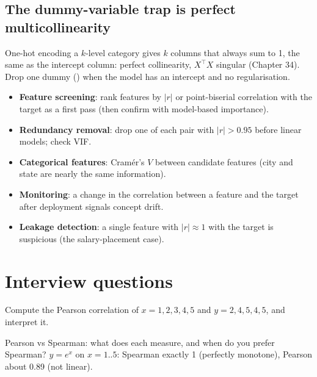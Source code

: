 \subsection{The dummy-variable trap is perfect multicollinearity}
One-hot encoding a $k$-level category gives $k$ columns that always sum to 1, the same as the intercept column: perfect collinearity, $X^\top X$ singular
(Chapter 34). Drop one dummy () when the model has an intercept and no regularisation.

\begin{practical}
\begin{itemize}
\item \textbf{Feature screening}: rank features by $|r|$ or point-biserial correlation with the target as a first pass (then confirm with model-based importance).
\item \textbf{Redundancy removal}: drop one of each pair with $|r| > 0.95$ before linear models; check VIF.
\item \textbf{Categorical features}: Cram\'er's $V$ between candidate features (city and state are nearly the same information).
\item \textbf{Monitoring}: a change in the correlation between a feature and the target after deployment signals concept drift.
\item \textbf{Leakage detection}: a single feature with $|r| \approx 1$ with the target is suspicious (the salary-placement case).
\end{itemize}
\end{practical}

\section{Interview questions}

\begin{qa}{Compute the Pearson correlation of $x = 1,2,3,4,5$ and $y = 2,4,5,4,5$, and interpret it.}
\end{qa}

\begin{qa}{Pearson vs Spearman: what does each measure, and when do you prefer Spearman?}
\worked $y = e^x$ on $x = 1..5$: Spearman exactly 1 (perfectly monotone), Pearson about 0.89 (not linear).
\end{qa}

